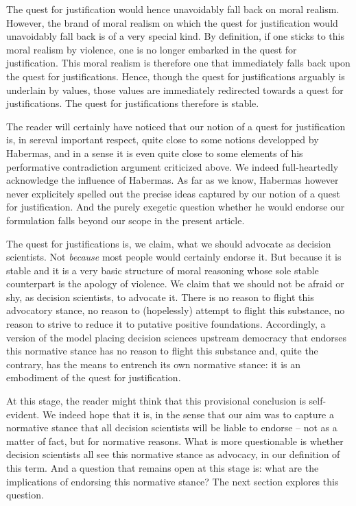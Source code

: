 \documentclass[preprint,11pt]{elsarticle}
\begin{document}
The quest for justification would hence unavoidably fall back on moral realism. However, the brand of moral realism on which the quest for justification would unavoidably fall back is of a very special kind. By definition, if one sticks to this moral realism by violence, one is no longer embarked in the quest for justification. This moral realism is therefore one that immediately falls back upon the quest for justifications. Hence, though the quest for justifications arguably is underlain by values, those values are immediately redirected towards a quest for justifications. The quest for justifications therefore is stable.

The reader will certainly have noticed that our notion of a quest for justification is, in sereval important respect, quite close to some notions developped by Habermas, and in a sense it is even quite close to some elements of his performative contradiction argument criticized above. We indeed full-heartedly acknowledge the influence of Habermas. As far as we know, Habermas however never explicitely spelled out the precise ideas captured by our notion of a quest for justification. And the purely exegetic question whether he would endorse our formulation falls beyond our scope in the present article. 

The quest for justifications is, we claim, what we should advocate as decision scientists. Not \emph{because} most people would certainly endorse it. But because it is stable and it is a very basic structure of moral reasoning whose sole stable counterpart is the apology of violence. We claim that we should not be afraid or shy, as decision scientists, to advocate it. There is no reason to flight this advocatory stance, no reason to (hopelessly) attempt to flight this substance, no reason to strive to reduce it to putative positive foundations. Accordingly, a version of the model placing decision sciences upstream democracy that endorses this normative stance has no reason to flight this substance and, quite the contrary, has the means to entrench its own normative stance: it is an embodiment of the quest for justification. 

At this stage, the reader might think that this provisional conclusion is self-evident. We indeed hope that it is, in the sense that our aim was to capture a normative stance that all decision scientists will be liable to endorse -- not as a matter of fact, but for normative reasons. What is more questionable is whether decision scientists all see this normative stance as advocacy, in our definition of this term. And a question that remains open at this stage is: what are the implications of endorsing this normative stance? The next section explores this question.
\end{document}
